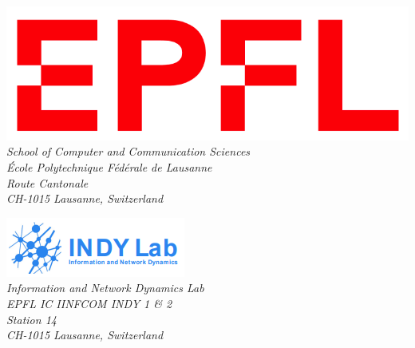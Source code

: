 \begin{titlepage}
\begin{minipage}[t]{0.5\textwidth}
    \centering
    \includegraphics[width=0.8\linewidth]{logo_epfl.png}\\[0.5cm]
    \textit{School of Computer and Communication Sciences}\\
    \textit{École Polytechnique Fédérale de Lausanne}\\
    \textit{Route Cantonale}\\
    \textit{CH-1015 Lausanne, Switzerland}
\end{minipage}%
\begin{minipage}[t]{0.5\textwidth}
    \centering
    \includegraphics[width=0.8\linewidth]{logo_indy_lab.png}\\[0.5cm]
    \textit{Information and Network Dynamics Lab}\\
    \textit{EPFL IC IINFCOM INDY 1 \& 2}\\
    \textit{Station 14}\\
    \textit{CH-1015 Lausanne, Switzerland}
\end{minipage}

\vfill %

\end{titlepage}

